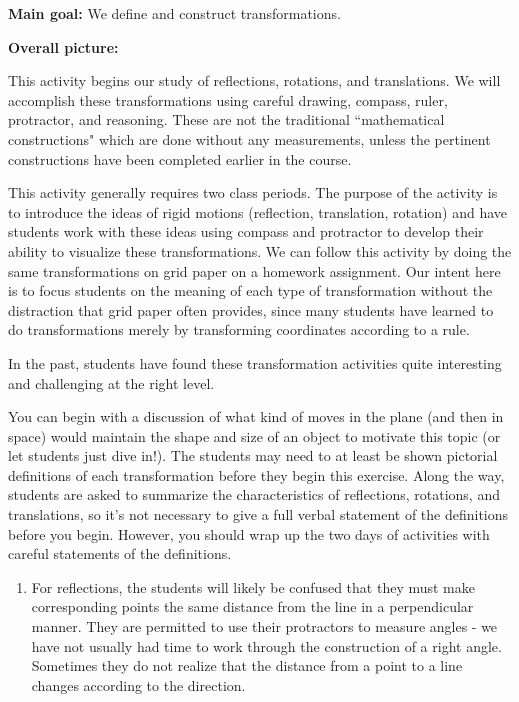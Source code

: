 \documentclass[nooutcomes,noauthor, handout]{ximera}
\begin{document}

\newpage


\begin{instructorNotes}
{\bf Main goal:} We define and construct transformations.

{\bf Overall picture:} 

This activity begins our study of reflections, rotations, and translations.  We will accomplish these transformations using careful drawing, compass, ruler, protractor, and reasoning.  These are not the traditional ``mathematical constructions" which are done without any measurements, unless the pertinent constructions have been completed earlier in the course.


This activity generally requires two class periods.  The purpose of the activity is to  introduce the ideas of rigid motions (reflection, translation, rotation) and have students work with these ideas using compass and protractor to develop their ability to visualize these transformations.  We can follow this activity by doing the same transformations on grid paper on a homework assignment.  Our intent here is to focus students on the meaning of each type of transformation without the distraction that grid paper often provides, since many students have learned to do transformations merely by transforming coordinates according to a rule.

In the past, students have found these transformation activities quite interesting and challenging at the right level.

You can begin with a discussion of what kind of moves in the plane (and then in space) would maintain the shape and size of an object to motivate this topic (or let students just dive in!). The students may need to at least be shown pictorial definitions of each transformation before they begin this exercise.  Along the way, students are asked to summarize the characteristics of reflections, rotations, and translations, so it's not necessary to give a full verbal statement of the definitions before you begin. However, you should wrap up the two days of activities with careful statements of the definitions.  

\begin{enumerate}
\item For reflections, the students will likely be confused that they must make corresponding points the same distance from the line in a perpendicular manner. They are permitted to use their protractors to measure angles - we have not usually had time to work through the construction of a right angle.  Sometimes they do not realize that the distance from a point to a line changes according to the direction.\\ 


\end{enumerate}
\end{instructorNotes}
\end{document}

